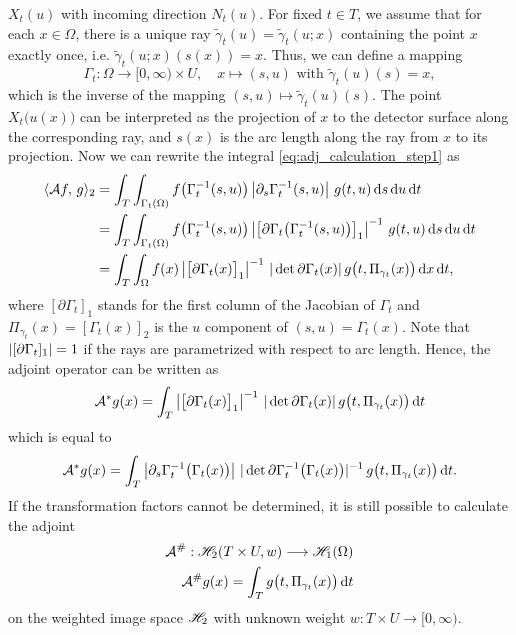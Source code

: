 \documentclass{amsart}
\begin{document}
$X_t(u)$ with incoming direction $N_t(u)$. For fixed $t \in T$, we assume that for each $x \in \Omega$, there is a unique ray 
$\tilde \gamma_t(u) = \tilde \gamma_t(u; x)$ containing the point $x$ exactly once, i.e. $\tilde \gamma_t(u; x)(s(x)) = x$. Thus, we can 
define a 
mapping
%
\begin{equation*}
 \Gamma_t: \Omega \to [0, \infty) \times U,\quad x \mapsto (s, u) \text{ with } \tilde \gamma_t(u)(s) = x,
\end{equation*}
%
which is the inverse of the mapping $(s,u) \mapsto \tilde \gamma_t(u)(s)$. The point $X_t\big(u(x)\big)$ can be interpreted as the 
projection of 
$x$ to the detector surface along the corresponding ray, and $s(x)$ is the arc length along the ray from $x$ to its projection. 
Now we can rewrite the integral \eqref{eq:adj_calculation_step1} as
%
\begin{align*}
 \langle {\ensuremath{\mathcal{A}}} f,\,g\rangle_2
 &= \int_T \int_{\Gamma_t(\Omega)} f\big(\Gamma_t^{-1}(s,u)\big) \left| \partial_s \Gamma_t^{-1}(s,u) \right|\, g(t, u)\, \mathrm{d} s\, \mathrm{d} u\, 
 \mathrm{d} t  \\
 &= \int_T \int_{\Gamma_t(\Omega)} f\big(\Gamma_t^{-1}(s,u)\big) \left| \big[\partial \Gamma_t\big(\Gamma_t^{-1}(s,u)\big)\big]_1 \right|^{-1}\, 
 g(t, u)\, \mathrm{d}  s\, \mathrm{d} u\, \mathrm{d} t \\
 &= \int_T \int_\Omega f(x) \left| \big[\partial \Gamma_t(x)\big]_1 \right|^{-1}\, |\operatorname*{det}{\partial \Gamma_t(x)}|\, 
 g\big(t, \Pi_{\gamma_t}(x)\big)
 \, \mathrm{d} x\, \mathrm{d} t,
\end{align*}
%
where $[\partial \Gamma_t]_1$ stands for the first column of the Jacobian of $\Gamma_t$ and $\Pi_{\gamma_t}(x) = [\Gamma_t(x)]_2$ is the 
$u$ component of $(s, u) = \Gamma_t(x)$. Note that $|[\partial \Gamma_t]_1| = 1$ if the rays are parametrized with respect to arc 
length. Hence, the adjoint operator can be written as
%
\begin{equation}
 \label{eq:adj_op_onedir}
 {\ensuremath{{\mathcal{A}}^*}} g(x) = \int_T \left| \big[\partial \Gamma_t(x)\big]_1 \right|^{-1}\, |\operatorname*{det}{\partial \Gamma_t(x)}|\, g\big(t, 
\Pi_{\gamma_t}(x)\big)\, 
 \mathrm{d} t
\end{equation}
%
which is equal to
%
\begin{equation}
 \label{eq:adj_op_onedir_alt}
 {\ensuremath{{\mathcal{A}}^*}} g(x) = \int_T \left| \partial_s \Gamma_t^{-1}\big(\Gamma_t(x)\big) \right|\, 
 |\operatorname*{det}{\partial \Gamma_t^{-1}\big(\Gamma_t(x)\big)}|^{-1}\, g\big(t, \Pi_{\gamma_t}(x)\big)\, \mathrm{d} t.
\end{equation}
%
If the transformation factors cannot be determined, it is still possible to calculate the adjoint
%
\begin{align}
 {\ensuremath{\mathcal{A}}}^\#: {\mathscr{H}}_2(T \times U, w) \longrightarrow {\ensuremath{\mathscr{H}}}_1(\Omega) \notag \\
 \label{eq:adj_op_onedir_weighted}
 {\ensuremath{\mathcal{A}}}^\# g(x) = \int_T g\big(t, \Pi_{\gamma_t}(x)\big)\, \mathrm{d} t
\end{align}
%
on the weighted image space ${\mathscr{H}}_2$ with unknown weight $w: T \times U \to [0, \infty)$. 
\end{document}
